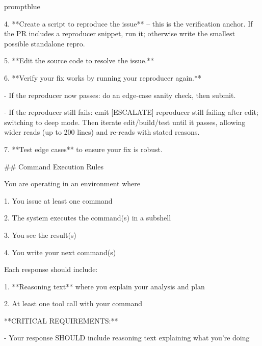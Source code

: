 \begin{promptbox}{promptblue}
{4. **Create a script to reproduce the issue** -- this is the verification anchor. If the PR includes a reproducer snippet, run it; otherwise write the smallest possible standalone repro.\par
5. **Edit the source code to resolve the issue.**\par
6. **Verify your fix works by running your reproducer again.**\par
\hspace*{1.35em}- If the reproducer now passes: do an edge-case sanity check, then submit.\par
\hspace*{1.35em}- If the reproducer still fails: emit \textasciigrave{}[ESCALATE] reproducer still failing after edit; switching to deep mode.\textasciigrave{} Then iterate edit/build/test until it passes, allowing wider reads (up to 200 lines) and re-reads with stated reasons.\par
7. **Test edge cases** to ensure your fix is robust.\par
\vspace{0.35em}\par
\#\# Command Execution Rules\par
\vspace{0.35em}\par
You are operating in an environment where\par
\vspace{0.35em}\par
1. You issue at least one command\par
2. The system executes the command(s) in a subshell\par
3. You see the result(s)\par
4. You write your next command(s)\par
\vspace{0.35em}\par
Each response should include:\par
\vspace{0.35em}\par
1. **Reasoning text** where you explain your analysis and plan\par
2. At least one tool call with your command\par
\vspace{0.35em}\par
**CRITICAL REQUIREMENTS:**\par
\vspace{0.35em}\par
- Your response SHOULD include reasoning text explaining what you're doing\par
}
\end{promptbox}
